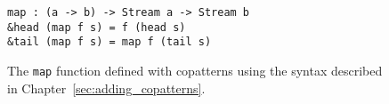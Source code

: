 \begin{figure}[h]
\begin{lstlisting}[mathescape]
map : (a -> b) -> Stream a -> Stream b
&head (map f s) = f (head s)
&tail (map f s) = map f (tail s)
\end{lstlisting}
\caption{The \texttt{map} function defined with copatterns using the syntax
  described in Chapter~\ref{sec:adding_copatterns}.}
\label{fig:map_copat_syntax}
\end{figure}

